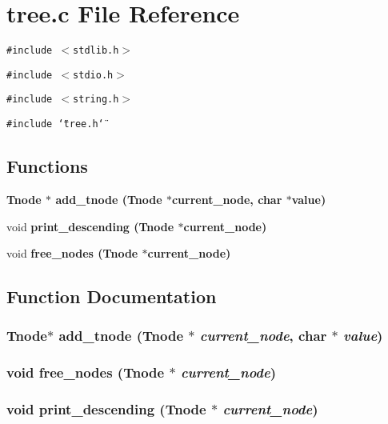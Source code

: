\section{tree.c File Reference}
\label{tree_8c}
{\tt \#include $<$stdlib.h$>$}\par
{\tt \#include $<$stdio.h$>$}\par
{\tt \#include $<$string.h$>$}\par
{\tt \#include \char`\"{}tree.h\char`\"{}}\par
\subsection*{Functions}
\begin{CompactItemize}
\item 
\bf{Tnode} $\ast$ \bf{add\_\-tnode} (\bf{Tnode} $\ast$current\_\-node, char $\ast$value)
\item 
void \bf{print\_\-descending} (\bf{Tnode} $\ast$current\_\-node)
\item 
void \bf{free\_\-nodes} (\bf{Tnode} $\ast$current\_\-node)
\end{CompactItemize}


\subsection{Function Documentation}
\subsubsection{\setlength{\rightskip}{0pt plus 5cm}\bf{Tnode}$\ast$ add\_\-tnode (\bf{Tnode} $\ast$ {\em current\_\-node}, char $\ast$ {\em value})}\label{tree_8c_b3161ce8e2e39e0bca7d1fc0babd9e38}


\subsubsection{\setlength{\rightskip}{0pt plus 5cm}void free\_\-nodes (\bf{Tnode} $\ast$ {\em current\_\-node})}\label{tree_8c_38f92de0257bd8aada7176be5ce35a08}


\subsubsection{\setlength{\rightskip}{0pt plus 5cm}void print\_\-descending (\bf{Tnode} $\ast$ {\em current\_\-node})}\label{tree_8c_b493eaa1755048d7ffe5884d4a3abdd9}


